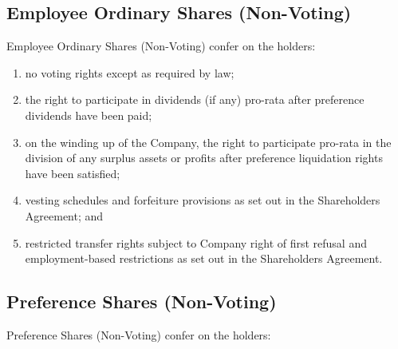 \subsection{Employee Ordinary Shares (Non-Voting)}

Employee Ordinary Shares (Non-Voting) confer on the holders:

\begin{enumerate}[label=(\alph*)]
    \item no voting rights except as required by law;
    
    \item the right to participate in dividends (if any) pro-rata after preference dividends have been paid;
    
    \item on the winding up of the Company, the right to participate pro-rata in the division of any surplus assets or profits after preference liquidation rights have been satisfied;
    
    \item vesting schedules and forfeiture provisions as set out in the Shareholders Agreement; and
    
    \item restricted transfer rights subject to Company right of first refusal and employment-based restrictions as set out in the Shareholders Agreement.
\end{enumerate}

\subsection{Preference Shares (Non-Voting)}

Preference Shares (Non-Voting) confer on the holders:

